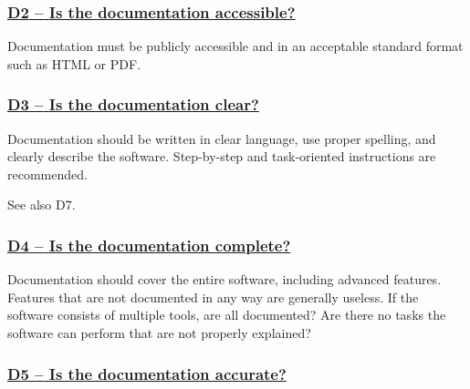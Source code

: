\documentclass[a4paper,11pt]{article}
\newcommand{\indicator}[1]{\subsubsection*{\underline{#1}}}
\begin{document}
%
%
%

\newcommand{\dTwoName}{D2}
\newcommand{\dTwoID}{\dTwoName}
\newcommand{\dTwoText}{Is the documentation accessible?}
\indicator{\dTwoName{ }--{ }\dTwoText}\label{id:d2}

Documentation must be publicly accessible and in an acceptable standard format
such as HTML or PDF.

\newcommand{\dThreeName}{D3}
\newcommand{\dThreeID}{\dThreeName}
\newcommand{\dThreeText}{Is the documentation clear?}
\indicator{\dThreeName{ }--{ }\dThreeText}\label{id:d3}

Documentation should be written in clear language, use proper spelling, and
clearly describe the software. Step-by-step and task-oriented instructions are
recommended.

See also D7.

\newcommand{\dFourName}{D4}
\newcommand{\dFourID}{\dFourName}
\newcommand{\dFourText}{Is the documentation complete?}
\indicator{\dFourName{ }--{ }\dFourText}\label{id:d4}

Documentation should cover the entire software, including advanced features.
Features that are not documented in any way are generally useless. If the
software consists of multiple tools, are all documented? Are there no tasks the
software can perform that are not properly explained?

%
%
%

\newcommand{\dFiveName}{D5}
\newcommand{\dFiveID}{\dFiveName}
\newcommand{\dFiveText}{Is the documentation accurate?}
\indicator{\dFiveName{ }--{ }\dFiveText}\label{id:d5}
\end{document}
